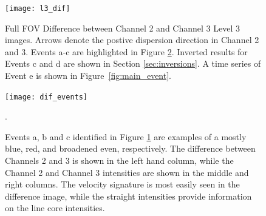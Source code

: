    		
   		\begin{figure}[htb!]
   			\centering
   			\texttt{[image: l3\_dif]}
   			\caption{Full FOV Difference between Channel 2 and Channel 3 Level 3 images.  
   			Arrows denote the postive dispersion direction in Channel 2 and 3.
   			Events a-c are highlighted in Figure \ref{fig:dif_events}.    
   			Inverted results for Events c and d are shown in Section \ref{sec:inversions}. 
   			A time series of Event e is shown in Figure~\ref{fig:main_event}.}
   			\label{fig:l3_dif}
   		\end{figure}
   	
   	
 		\begin{figure}[htb!]
   			\centering
   			\texttt{[image: dif\_events]}
   			\caption{Events a, b and c identified in Figure \ref{fig:l3_dif} are examples of a mostly blue, red, and broadened even, respectively. The difference between Channels 2 and 3 is shown in the left hand column, while the Channel 2 and Channel 3 intensities are shown in the middle and right columns.  The velocity signature is most easily seen in the difference image, while the straight intensities provide information on the line core intensities. 
   			}
   			\label{fig:dif_events}. 
   		\end{figure}

    	
